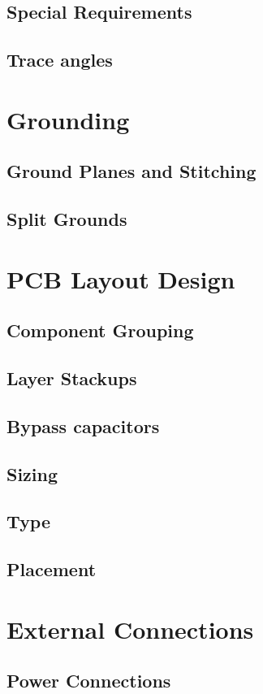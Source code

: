 \subsection{Special Requirements}
\subsection{Trace angles}

\section{Grounding}
\subsection{Ground Planes and Stitching}
\subsection{Split Grounds}

\section{PCB Layout Design}
\subsection{Component Grouping}
\subsection{Layer Stackups}
\subsection{Bypass capacitors}
\subsection{Sizing}
\subsection{Type}
\subsection{Placement}

\section{External Connections}
\subsection{Power Connections}
